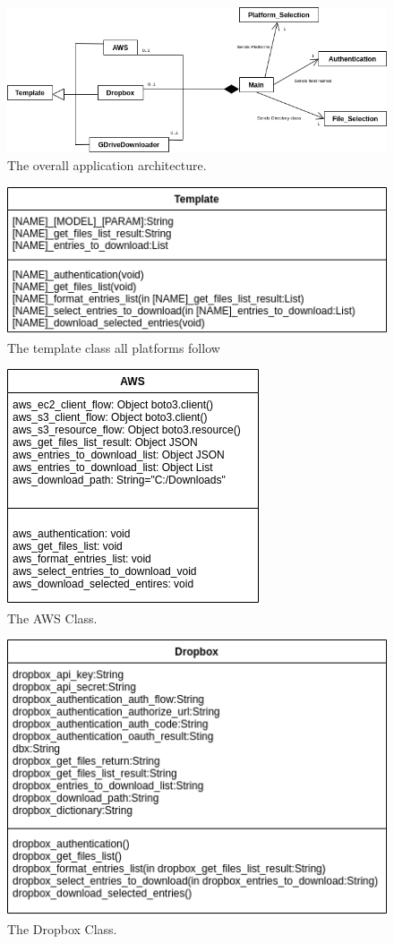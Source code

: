 \documentclass{article}
\begin{document}
\begin{figure}[H]
\includegraphics[scale=.65]{des_all}
\centering
\caption{The overall application architecture.}
\end{figure}

\begin{figure}[p]
\includegraphics[scale=.5]{template}
\centering
\caption{The template class all platforms follow}
\end{figure}

\begin{figure}[p]
\includegraphics[scale=.5]{des_aws}
\centering
\caption{The AWS Class.}
\end{figure}

\begin{figure}[p]
\includegraphics[scale=.5]{Dropbox}
\centering
\caption{The Dropbox Class.}
\end{figure}
\end{document}
